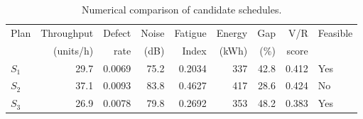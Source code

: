 \begin{table}[htbp]
\centering
\caption{Numerical comparison of candidate schedules.}
\label{tab:numerical-sim}
\small
\begin{tabular}{@{}lrrrrrrrl@{}}
\toprule
Plan & Throughput & Defect & Noise & Fatigue & Energy & Gap & V/R & Feasible \\
     & (units/h)  & rate   & (dB)  & Index   & (kWh)  & (\%) & score &         \\
\midrule
$S_{1}$ & 29.7 & 0.0069 & 75.2 & 0.2034 & 337 & 42.8 & 0.412 & Yes \\
$S_{2}$ & 37.1 & 0.0093 & 83.8 & 0.4627 & 417 & 28.6 & 0.424 & No \\
$S_{3}$ & 26.9 & 0.0078 & 79.8 & 0.2692 & 353 & 48.2 & 0.383 & Yes \\
\bottomrule
\end{tabular}
\end{table}
